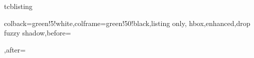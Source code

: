 \begin{docEnvironment}{tcblisting}{}
\begin{dispExample}
\begin{tcblisting}{colback=green!5!white,colframe=green!50!black,listing only,
hbox,enhanced,drop fuzzy shadow,before=\begin{center},after=\end{center}}
\end{tcblisting}
\end{dispExample}
\end{docEnvironment}